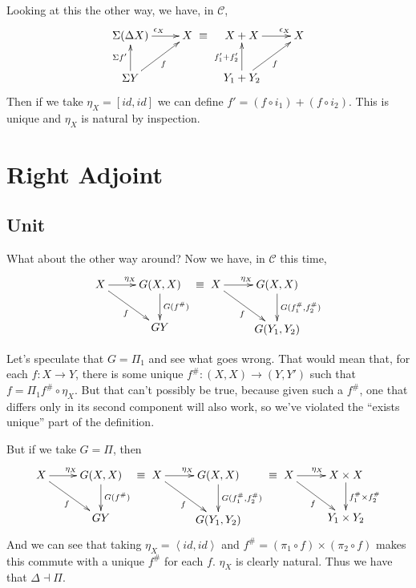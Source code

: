 \documentclass[letterpaper]{article}
\newcommand{\ang}[1]{\left\langle{#1}\right\rangle}
\begin{document}
Looking at this the other way, we have, in $\mathcal{C}$,
\[ \xymatrix{
	\Sigma (\Delta X) \ar[r]^{\epsilon_X} & X \\
    \Sigma Y \ar[u]^{\Sigma f'} \ar[ur]_{f}
} \equiv \xymatrix{
	X + X \ar[r]^(.75){\epsilon_X} & X \\
    Y_1 + Y_2 \ar[u]^{f'_1 + f'_2} \ar[ur]_{f}
} \] 
Then if we take $\eta_X = [id,id]$ we can define $f' = (f \circ i_1) + (f
\circ i_2)$.  This is unique and $\eta_X$ is natural by inspection.

\section{Right Adjoint}
\subsection{Unit}

What about the other way around?  Now we have, in $\mathcal{C}$ this time,
\[ \xymatrix{
	X \ar[r]^{\eta_X} \ar[rd]_{f} & G (X, X) \ar[d]^{G (f^\#)} \\
                                  & G Y
} \equiv \xymatrix {
	X \ar[r]^{\eta_X} \ar[rd]_{f} & G (X, X) \ar[d]^{G (f^\#_1, f^\#_2)} \\
                                  & G (Y_1, Y_2)
}  \]

Let's speculate that $G = \Pi_1$ and see what goes wrong.  That would mean
that, for each $f : X \to Y$, there is some unique $f^\# : (X,X) \to (Y,Y')$
such that $f = \Pi_1 f^\# \circ \eta_X$.  But that can't possibly be true, because
given such a $f^\#$, one that differs only in its second component will also
work, so we've violated the ``exists unique'' part of the definition.

But if we take $G = \Pi$, then
\[ \xymatrix{
	X \ar[r]^{\eta_X} \ar[rd]_{f} & G (X, X) \ar[d]^{G (f^\#)} \\
                                  & G Y
} \equiv \xymatrix {
	X \ar[r]^{\eta_X} \ar[rd]_{f} & G (X, X) \ar[d]^{G (f^\#_1, f^\#_2)} \\
                                  & G (Y_1, Y_2)
} \equiv \xymatrix {
	X \ar[r]^{\eta_X} \ar[rd]_{f} & X \times X \ar[d]^{f^\#_1 \times f^\#_2} \\
                                  & Y_1 \times Y_2
}  \]
And we can see that taking $\eta_X = \ang{id,id}$ and $f^\# = (\pi_1 \circ f)
\times (\pi_2 \circ f)$ makes this commute with a unique $f^\#$ for each
$f$.  $\eta_X$ is clearly natural.  Thus we have that $\Delta \dashv \Pi$.
\end{document}
